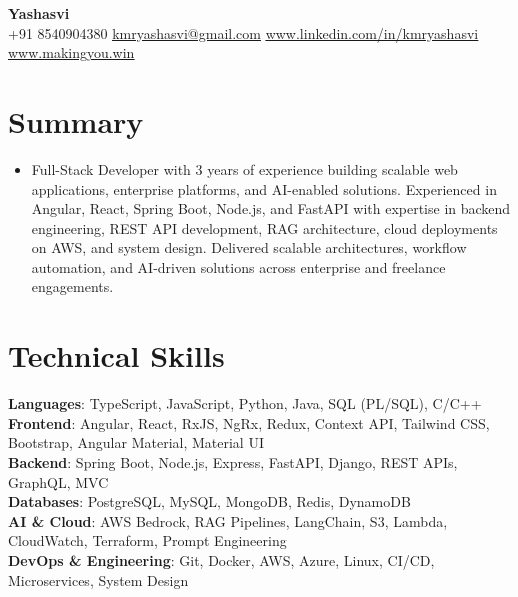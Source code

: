 \documentclass[letterpaper,11pt]{article}
\newcommand{\resumeItem}[1]{\item\small{{#1 \vspace{-2pt}}}}
\newcommand{\resumeSubHeadingListStart}{\begin{itemize}[leftmargin=0.0in, label={}]}
\newcommand{\resumeSubHeadingListEnd}{\end{itemize}}
\begin{document}
\begin{center}
    {\Huge\bfseries Yashasvi} \\ \vspace{1pt}
    \small
    +91 8540904380 \hspace{0.5em}\textbar \hspace{0.5em}
    \href{mailto:kmryashasvi@gmail.com}{\underline{kmryashasvi@gmail.com}}
    \hspace{0.5em}\textbar\hspace{0.5em}
    \href{https://linkedin.com/in/kmryashasvi}{\underline{www.linkedin.com/in/kmryashasvi}}
    \hspace{0.5em}\textbar\hspace{0.5em}
    \href{https://makingyou.win}{\underline{www.makingyou.win}}
    \vspace{-8pt}
\end{center}

\section{Summary}
\resumeSubHeadingListStart
\resumeItem{Full-Stack Developer with 3 years of experience building scalable web applications, enterprise platforms, and AI-enabled solutions. Experienced in Angular, React, Spring Boot, Node.js, and FastAPI with expertise in backend engineering, REST API development, RAG architecture, cloud deployments on AWS, and system design. Delivered scalable architectures, workflow automation, and AI-driven solutions across enterprise and freelance engagements.}
\resumeSubHeadingListEnd
\vspace{-10pt}

\section{Technical Skills}
\begin{itemize}[leftmargin=0.15in, label={}]
\small{\item{
\textbf{Languages}{: TypeScript, JavaScript, Python, Java, SQL (PL/SQL), C/C++} \\
\textbf{Frontend}{: Angular, React, RxJS, NgRx, Redux, Context API, Tailwind CSS, Bootstrap, Angular Material, Material UI} \\
\textbf{Backend}{: Spring Boot, Node.js, Express, FastAPI, Django, REST APIs, GraphQL, MVC} \\
\textbf{Databases}{: PostgreSQL, MySQL, MongoDB, Redis, DynamoDB} \\
\textbf{AI \& Cloud}{: AWS Bedrock, RAG Pipelines, LangChain, S3, Lambda, CloudWatch, Terraform, Prompt Engineering} \\
\textbf{DevOps \& Engineering}{: Git, Docker, AWS, Azure, Linux, CI/CD, Microservices, System Design}
}}
\end{itemize}
\vspace{-12pt}
\end{document}

